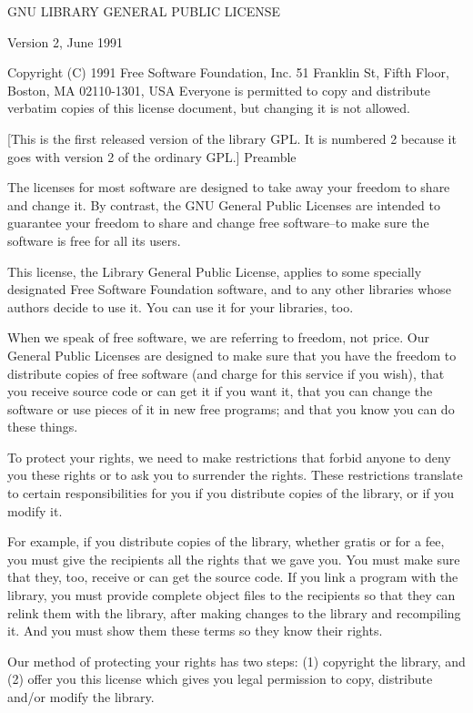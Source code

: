 \begin{DoxyVerb}GNU LIBRARY GENERAL PUBLIC LICENSE

Version 2, June 1991

Copyright (C) 1991 Free Software Foundation, Inc.
51 Franklin St, Fifth Floor, Boston, MA  02110-1301, USA
Everyone is permitted to copy and distribute verbatim copies
of this license document, but changing it is not allowed.

[This is the first released version of the library GPL.  It is
 numbered 2 because it goes with version 2 of the ordinary GPL.]
Preamble

The licenses for most software are designed to take away your freedom to share and change it. By
contrast, the GNU General Public Licenses are intended to guarantee your freedom to share and change
free software--to make sure the software is free for all its users.

This license, the Library General Public License, applies to some specially designated Free Software
Foundation software, and to any other libraries whose authors decide to use it. You can use it for
your libraries, too.

When we speak of free software, we are referring to freedom, not price. Our General Public Licenses
are designed to make sure that you have the freedom to distribute copies of free software (and
charge for this service if you wish), that you receive source code or can get it if you want it,
that you can change the software or use pieces of it in new free programs; and that you know you can
do these things.

To protect your rights, we need to make restrictions that forbid anyone to deny you these rights or
to ask you to surrender the rights. These restrictions translate to certain responsibilities for you
if you distribute copies of the library, or if you modify it.

For example, if you distribute copies of the library, whether gratis or for a fee, you must give the
recipients all the rights that we gave you. You must make sure that they, too, receive or can get
the source code. If you link a program with the library, you must provide complete object files to
the recipients so that they can relink them with the library, after making changes to the library
and recompiling it. And you must show them these terms so they know their rights.

Our method of protecting your rights has two steps: (1) copyright the library, and (2) offer you
this license which gives you legal permission to copy, distribute and/or modify the library.


\end{DoxyVerb}
